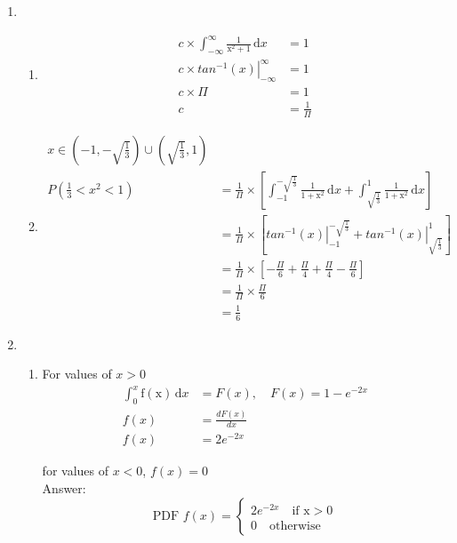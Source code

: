 \documentclass[a4paper, 12pt]{article}
\begin{document}
\begin{enumerate}
	\item 
		\begin{enumerate}
		\item
			\begin{align*}
			c\times\int_{-\infty}^{\infty} \mathrm{
			\frac{1}{x^2+1}}\,\mathrm{d}x &= 1\\
			c\times\left.tan^{-1} (x)\right|_{-\infty}^
			{\infty} &= 1\\
			c \times \Pi &= 1\\
			c &= \frac{1}{\Pi}
			\end{align*}
		\item 
			\begin{align*}
			x \in \left(-1, -\sqrt{\frac{1}{3}}\right)
			\cup \left(\sqrt{\frac{1}{3}}, 1\right)\\
			P\left(\frac{1}{3}<x^2<1\right) &= \frac{1}{\Pi}
			\times\left[\int_{-1}^{-\sqrt{\frac{1}{3}}} 
			\mathrm{\frac{1}{1+x^2}}\,\mathrm{d}x + 
			\int_{\sqrt{\frac{1}{3}}}^{1} 
			\mathrm{\frac{1}{1+x^2}}\,\mathrm{d}x\right]\\
			&= \frac{1}{\Pi} \times \left[
			\left.tan^{-1} (x)\right|_{-1}^{-\sqrt{\frac{1}{3}}}
			+ \left.tan^{-1} (x)\right|_{\sqrt{\frac{1}{3}}}^{1}
			\right]\\
			&= \frac{1}{\Pi} \times \left[ -\frac{\Pi}{6}
			+ \frac{\Pi}{4} + \frac{\Pi}{4} - \frac{\Pi}{6} 
			\right]\\
			&= \frac{1}{\Pi} \times \frac{\Pi}{6}\\
			&= \frac{1}{6}
			\end{align*}
		\end{enumerate}

		\item 
		\begin{enumerate}
			\item For values of $x > 0$
			\begin{align*}
				\int_{0}^{x} \mathrm{f(x)}\,\mathrm{d}x &=
				F(x),\quad F(x) = 1 - e^{-2x}\\
				f(x) &= \frac{dF(x)}{dx}\\
				f(x) &= 2e^{-2x}
			\end{align*}
			
			for values of $x < 0$, $f(x) = 0$\\
			Answer:
			\[
				\text{PDF }f(x) = 
				\begin{cases}
					2e^{-2x} \quad \text{if x} > 0\\
					0 \quad \text{otherwise}
				\end{cases}
			\]
			

\end{enumerate}
\end{enumerate}
\end{document}
